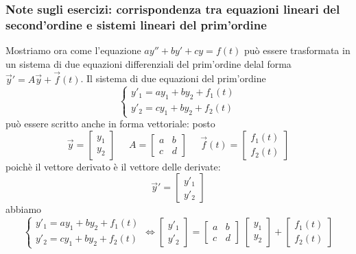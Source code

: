 \subsubsection{Note sugli esercizi: corrispondenza tra equazioni lineari del second'ordine e sistemi lineari del prim'ordine}
Mostriamo ora come l'equazione $a y'' + by' + cy = f(t)$ può essere trasformata in un sistema di due equazioni differenziali del prim'ordine delal forma $\vec{y}' = A \vec{y} + \vec{f}(t)$.\newline
\newline
Il sistema di due equazioni del prim'ordine 
\[
    \begin{cases}
        y'_1 = ay_1 + by_2 + f_1(t)\\
        y'_2 = cy_1 + by_2 + f_2(t)
    \end{cases}
\]
può essere scritto anche in forma vettoriale: posto
\[
    \vec{y} = \left[\begin{matrix}
        y_1\\y_2        
    \end{matrix}\right] \;\;\;\;\; A = \left[\begin{matrix}
        a & b \\ c & d
    \end{matrix}\right] \;\;\;\;\; \vec{f}(t) = \left[\begin{matrix}
        f_1(t)\\f_2(t)
    \end{matrix}\right]
\]
poichè il vettore derivato è il vettore delle derivate:
\[
    \vec{y}' = \left[\begin{matrix}
        y'_1\\y'_2
    \end{matrix}\right]
\]
abbiamo
\[
    \begin{cases}
        y'_1 = ay_1 + by_2 + f_1(t)\\
        y'_2 = cy_1 + by_2 + f_2(t)
    \end{cases} \Leftrightarrow \left[\begin{matrix}
        y'_1\\y'_2        
    \end{matrix}\right] = \left[\begin{matrix}
        a & b \\ c & d
    \end{matrix}\right] \; \left[\begin{matrix}
        y_1\\y_2        
    \end{matrix}\right] + \left[\begin{matrix}
        f_1(t)\\f_2(t)
    \end{matrix}\right]
\]
